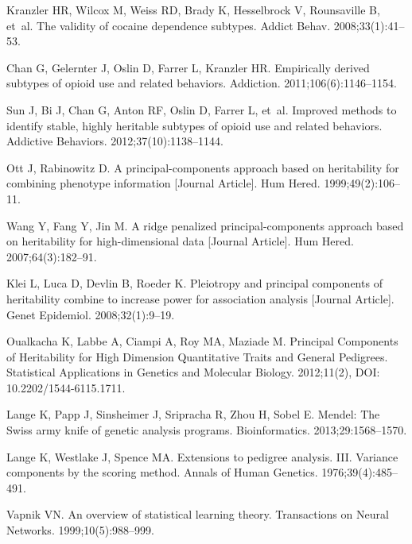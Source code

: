 \documentclass[10pt,letterpaper]{article}
\begin{document}
\begin{thebibliography}{10}
Kranzler HR, Wilcox M, Weiss RD, Brady K, Hesselbrock V, Rounsaville B, et~al.
\newblock The validity of cocaine dependence subtypes.
\newblock Addict Behav. 2008;33(1):41--53.

Chan G, Gelernter J, Oslin D, Farrer L, Kranzler HR.
\newblock Empirically derived subtypes of opioid use and related behaviors.
\newblock Addiction. 2011;106(6):1146--1154.

Sun J, Bi J, Chan G, Anton RF, Oslin D, Farrer L, et~al.
\newblock Improved methods to identify stable, highly heritable subtypes of
  opioid use and related behaviors.
\newblock Addictive Behaviors. 2012;37(10):1138--1144.

Ott J, Rabinowitz D.
\newblock A principal-components approach based on heritability for combining
  phenotype information [Journal Article].
\newblock Hum Hered. 1999;49(2):106--11.

Wang Y, Fang Y, Jin M.
\newblock A ridge penalized principal-components approach based on heritability
  for high-dimensional data [Journal Article].
\newblock Hum Hered. 2007;64(3):182--91.

Klei L, Luca D, Devlin B, Roeder K.
\newblock Pleiotropy and principal components of heritability combine to
  increase power for association analysis [Journal Article].
\newblock Genet Epidemiol. 2008;32(1):9--19.

Oualkacha K, Labbe A, Ciampi A, Roy MA, Maziade M.
\newblock Principal Components of Heritability for High Dimension Quantitative
  Traits and General Pedigrees.
\newblock Statistical Applications in Genetics and Molecular Biology.
  2012;11(2), DOI: 10.2202/1544-6115.1711.

Lange K, Papp J, Sinsheimer J, Sripracha R, Zhou H, Sobel E.
\newblock Mendel: The Swiss army knife of genetic analysis programs.
\newblock Bioinformatics. 2013;29:1568--1570.

Lange K, Westlake J, Spence MA.
\newblock Extensions to pedigree analysis. {III}. Variance components by the
  scoring method.
\newblock Annals of Human Genetics. 1976;39(4):485--491.

Vapnik VN.
\newblock An overview of statistical learning theory.
 Transactions on Neural Networks. 1999;10(5):988--999.


\end{thebibliography}
\end{document}
